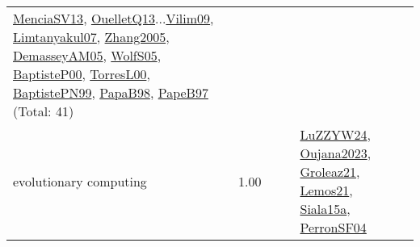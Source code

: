{\begin{longtable}{p{3cm}r>{\raggedright\arraybackslash}p{6cm}>{\raggedright\arraybackslash}p{6cm}>{\raggedright\arraybackslash}p{8cm}}
\hyperref[detail:MenciaSV13]{MenciaSV13}, \hyperref[detail:OuelletQ13]{OuelletQ13}...\hyperref[detail:Vilim09]{Vilim09}, \hyperref[detail:Limtanyakul07]{Limtanyakul07}, \hyperref[detail:Zhang2005]{Zhang2005}, \hyperref[detail:DemasseyAM05]{DemasseyAM05}, \hyperref[detail:WolfS05]{WolfS05}, \hyperref[detail:BaptisteP00]{BaptisteP00}, \hyperref[detail:TorresL00]{TorresL00}, \hyperref[detail:BaptistePN99]{BaptistePN99}, \hyperref[detail:PapaB98]{PapaB98}, \hyperref[detail:PapeB97]{PapeB97} (Total: 41)\\
\index{evolutionary computing}\index{Algorithms!evolutionary computing}evolutionary computing &  1.00 &  &  & \hyperref[detail:LuZZYW24]{LuZZYW24}, \hyperref[detail:Oujana2023]{Oujana2023}, \hyperref[detail:Groleaz21]{Groleaz21}, \hyperref[detail:Lemos21]{Lemos21}, \hyperref[detail:Siala15a]{Siala15a}, \hyperref[detail:PerronSF04]{PerronSF04}\\

\end{longtable}}
